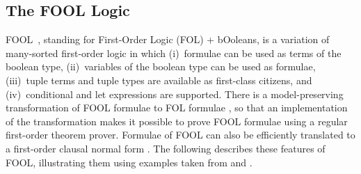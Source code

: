 \documentclass{easychair}
\begin{document}

\subsection{The FOOL Logic}
\label{FOOL}
FOOL~\cite{KKV15}, standing for First-Order Logic (FOL) + bOoleans, is a 
variation of many-sorted first-order logic in which (i)~formulae can
be used as terms of the boolean type, (ii)~variables of the boolean type can
be used as formulae, (iii)~tuple terms and tuple types are available as
first-class citizens, and (iv)~conditional and let expressions are supported.
There is a model-preserving transformation of FOOL formulae to FOL formulae
\cite{KKV15}, so that an implementation of the transformation makes it 
possible to prove FOOL formulae using a regular first-order theorem prover. 
Formulae of FOOL can also be efficiently translated to a first-order clausal 
normal form \cite{KK+16-GCAI}.
The following describes these features of FOOL, illustrating
them using examples taken from \cite{KK+16} and \cite{KKV18}.
\end{document}
